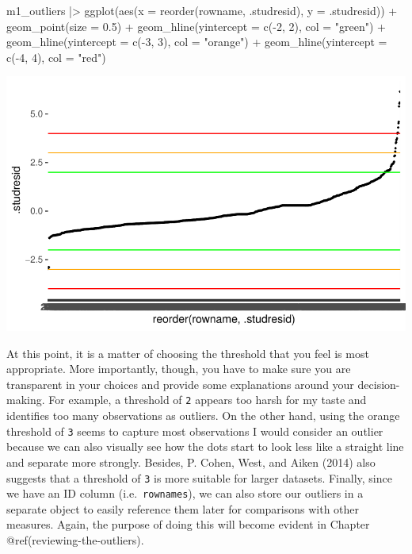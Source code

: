 \documentclass[
  letterpaper,
]{krantz}
\makeatletter
\newenvironment{Shaded}{\begin{snugshade}}{\end{snugshade}}
\newcommand{\AttributeTok}[1]{\textcolor[rgb]{0.40,0.45,0.13}{#1}}
\newcommand{\DecValTok}[1]{\textcolor[rgb]{0.68,0.00,0.00}{#1}}
\newcommand{\FloatTok}[1]{\textcolor[rgb]{0.68,0.00,0.00}{#1}}
\newcommand{\FunctionTok}[1]{\textcolor[rgb]{0.28,0.35,0.67}{#1}}
\newcommand{\NormalTok}[1]{\textcolor[rgb]{0.00,0.23,0.31}{#1}}
\newcommand{\SpecialCharTok}[1]{\textcolor[rgb]{0.37,0.37,0.37}{#1}}
\newcommand{\StringTok}[1]{\textcolor[rgb]{0.13,0.47,0.30}{#1}}
\newenvironment{kframe}{%
\medskip{}
\setlength{\fboxsep}{.8em}
 \def\at@end@of@kframe{}%
 \ifinner\ifhmode%
  \def\at@end@of@kframe{\end{minipage}}%
  \begin{minipage}{\columnwidth}%
 \fi\fi%
 \def\FrameCommand##1{\hskip\@totalleftmargin \hskip-\fboxsep
 \colorbox{shadecolor}{##1}\hskip-\fboxsep
     \hskip-\linewidth \hskip-\@totalleftmargin \hskip\columnwidth}%
 \MakeFramed {\advance\hsize-\width
   \@totalleftmargin\z@ \linewidth\hsize
   \@setminipage}}%
 {\par\unskip\endMakeFramed%
 \at@end@of@kframe}
\renewenvironment{Shaded}{\begin{kframe}}{\end{kframe}}
\makeatother
\begin{document}
\begin{Shaded}
\begin{Highlighting}[]
\NormalTok{m1\_outliers }\SpecialCharTok{|\textgreater{}}
  \FunctionTok{ggplot}\NormalTok{(}\FunctionTok{aes}\NormalTok{(}\AttributeTok{x =} \FunctionTok{reorder}\NormalTok{(rowname, .studresid),}
             \AttributeTok{y =}\NormalTok{ .studresid)) }\SpecialCharTok{+}
  \FunctionTok{geom\_point}\NormalTok{(}\AttributeTok{size =} \FloatTok{0.5}\NormalTok{) }\SpecialCharTok{+}
  \FunctionTok{geom\_hline}\NormalTok{(}\AttributeTok{yintercept =} \FunctionTok{c}\NormalTok{(}\SpecialCharTok{{-}}\DecValTok{2}\NormalTok{, }\DecValTok{2}\NormalTok{), }\AttributeTok{col =} \StringTok{"green"}\NormalTok{) }\SpecialCharTok{+}
  \FunctionTok{geom\_hline}\NormalTok{(}\AttributeTok{yintercept =} \FunctionTok{c}\NormalTok{(}\SpecialCharTok{{-}}\DecValTok{3}\NormalTok{, }\DecValTok{3}\NormalTok{), }\AttributeTok{col =} \StringTok{"orange"}\NormalTok{) }\SpecialCharTok{+}
    \FunctionTok{geom\_hline}\NormalTok{(}\AttributeTok{yintercept =} \FunctionTok{c}\NormalTok{(}\SpecialCharTok{{-}}\DecValTok{4}\NormalTok{, }\DecValTok{4}\NormalTok{), }\AttributeTok{col =} \StringTok{"red"}\NormalTok{)}
\end{Highlighting}
\end{Shaded}

\includegraphics{13_regressions_files/figure-pdf/plot-outliers-ext-stud-resid-1.pdf}

At this point, it is a matter of choosing the threshold that you feel is
most appropriate. More importantly, though, you have to make sure you
are transparent in your choices and provide some explanations around
your decision-making. For example, a threshold of \texttt{2} appears too
harsh for my taste and identifies too many observations as outliers. On
the other hand, using the orange threshold of \texttt{3} seems to
capture most observations I would consider an outlier because we can
also visually see how the dots start to look less like a straight line
and separate more strongly. Besides, P. Cohen, West, and Aiken (2014)
also suggests that a threshold of \texttt{3} is more suitable for larger
datasets. Finally, since we have an ID column (i.e.~\texttt{rownames}),
we can also store our outliers in a separate object to easily reference
them later for comparisons with other measures. Again, the purpose of
doing this will become evident in Chapter @ref(reviewing-the-outliers).
\end{document}
